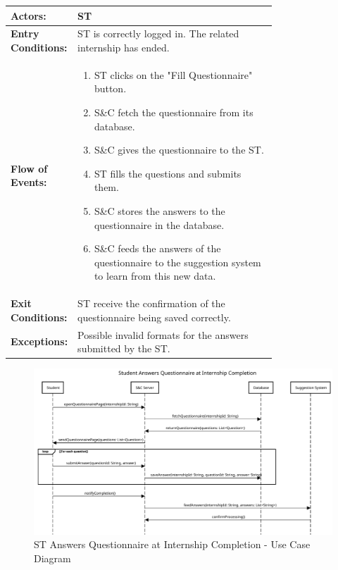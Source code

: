 \begin{center}
    \begin{longtable}{|l|p{0.75\linewidth}|}
        \hline
        \textbf{Actors:}           & ST                                                                                                     \\
        \hline
        \textbf{Entry Conditions:} & ST is correctly logged in. The related internship has ended.                                           \\
        \hline
        \textbf{Flow of Events:}   & \begin{enumerate}
                                         \item ST clicks on the "Fill Questionnaire" button.
                                         \item S\&C fetch the questionnaire from its database.
                                         \item S\&C gives the questionnaire to the ST.
                                         \item ST fills the questions and submits them.
                                         \item S\&C stores the answers to the questionnaire in the database.
                                         \item S\&C feeds the answers of the questionnaire to the suggestion system to learn from this new data.
                                     \end{enumerate} \\
        \hline
        \textbf{Exit Conditions:}  & ST receive the confirmation of the questionnaire being saved correctly.                                \\
        \hline
        \textbf{Exceptions:}       & Possible invalid formats for the answers submitted by the ST.                                          \\
        \hline
    \end{longtable}
\end{center}

\begin{figure}[H]
    \centering
    \includegraphics[width=1.0\textwidth]{Images/UC_7.pdf}
    \caption{ST Answers Questionnaire at Internship Completion - Use Case Diagram}
    \label{fig:use-case-diagram-7}
\end{figure}

